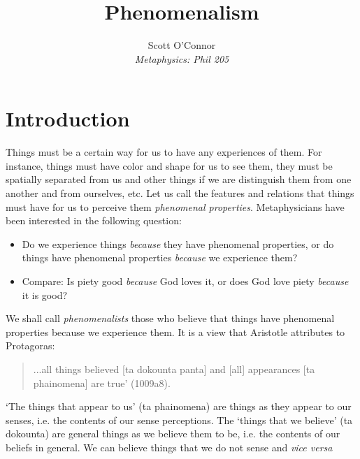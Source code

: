 \documentclass[article,oneside]{memoir}
\def\myaffiliation{Metaphysics: Phil 205}
\def\myauthor{Scott O'Connor}
\def\mytitle{Phenomenalism}
\begin{document}
\setsansfont[Mapping=tex-text]{Myriad Pro}  
\setmonofont[Mapping=tex-text,Scale=MatchLowercase]{Minion Pro} 
\pagestyle{kjh}

\title{\mytitle}

\author{\myauthor \\
 \emph{\myaffiliation \\ }}


\maketitle

\section{Introduction}

Things must be a certain way for us to have any experiences of them. For instance, things must have color and shape for us to see them, they must be spatially separated from us and other things if we are distinguish them from one another and from ourselves, etc. Let us call the features and relations that things must have for us to perceive them \emph{phenomenal properties}. Metaphysicians have been interested in the following question: 
\begin{itemize}
\item Do we experience things  \emph{because} they have phenomenal properties, or do things have phenomenal properties \emph{because} we experience them?
\item Compare: Is piety good \emph{because} God loves it, or does God love piety \emph{because} it is good? 
\end{itemize} 
We shall call \emph{phenomenalists} those who believe that things have phenomenal properties because we experience them.  It is a view that Aristotle attributes to Protagoras: 
\begin{quotation}
...all things believed [ta dokounta panta] and [all] appearances [ta phainomena] are true’ (1009a8).
\end{quotation}
`The things that appear to us' (ta phainomena) are things as they appear to our senses, i.e. the contents of our sense perceptions. The `things that we believe’ (ta dokounta) are general things as we believe them to be, i.e. the contents of our beliefs in general. We can believe things that we do not sense and \emph{vice versa} 
\end{document}

